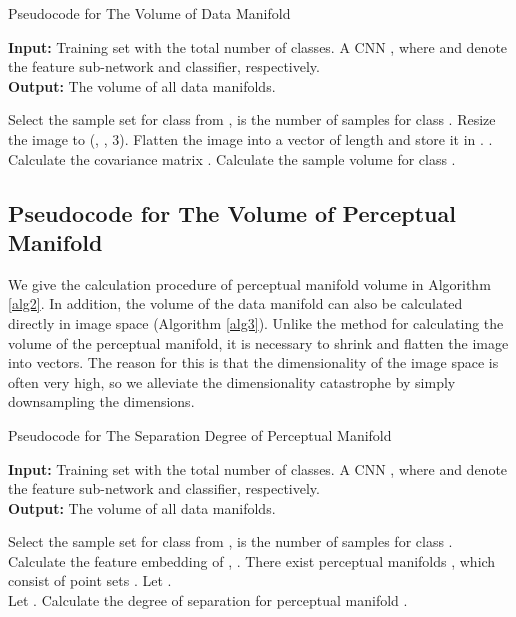 \documentclass[10pt,twocolumn,letterpaper]{article}
\begin{document}
\begin{algorithm*}[t]
\caption{Pseudocode for The Volume of Data Manifold}
\label{alg3}
\textbf{Input:} Training set  with the total number  of classes. A CNN , where  and  denote the feature sub-network and classifier, respectively. \\
\textbf{Output:} The volume of all data manifolds.
\begin{algorithmic}[1] 
   \STATE Select the sample set  for class  from ,  is the number of samples for class . 
   \STATE Resize the image to (, , 3). 
   \STATE Flatten the image into a vector of length  and store it in . 
   \STATE .  
   \STATE Calculate the covariance matrix .  
   \STATE Calculate the sample volume  for class .   
   \ENDFOR
\end{algorithmic}
\end{algorithm*}

\subsection*{Pseudocode for The Volume of Perceptual Manifold}
We give the calculation procedure of perceptual manifold volume in Algorithm \ref{alg2}. In addition, the volume of the data manifold can also be calculated directly in image space (Algorithm \ref{alg3}). Unlike the method for calculating the volume of the perceptual manifold, it is necessary to shrink and flatten the image into vectors. The reason for this is that the dimensionality of the image space is often very high, so we alleviate the dimensionality catastrophe by simply downsampling the dimensions.

\begin{algorithm*}[t]
\caption{Pseudocode for The Separation Degree of Perceptual Manifold}
\label{alg4}
\textbf{Input:} Training set  with the total number  of classes. A CNN , where  and  denote the feature sub-network and classifier, respectively. \\
\textbf{Output:} The volume of all data manifolds. 
\begin{algorithmic}[1] 
\STATE Select the sample set  for class  from ,  is the number of samples for class .
\STATE Calculate the feature embedding  of , .
\ENDFOR
 \STATE There exist  perceptual manifolds , which consist of point sets . Let . \\
   \STATE Let .
   \STATE Calculate the degree of separation  for perceptual manifold .
   \ENDFOR
\end{algorithmic}
\end{algorithm*}
\end{document}
